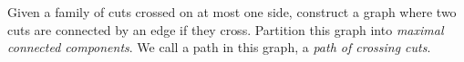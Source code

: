 \begin{definition}
	Given a family of cuts crossed on at most one side, construct a graph where two cuts are connected by an edge  if they cross. Partition this graph into {\em maximal connected components}.
	We call a path in this graph, a {\em path of crossing cuts}.
\end{definition}

%
%
%
%
%
%
%
%
